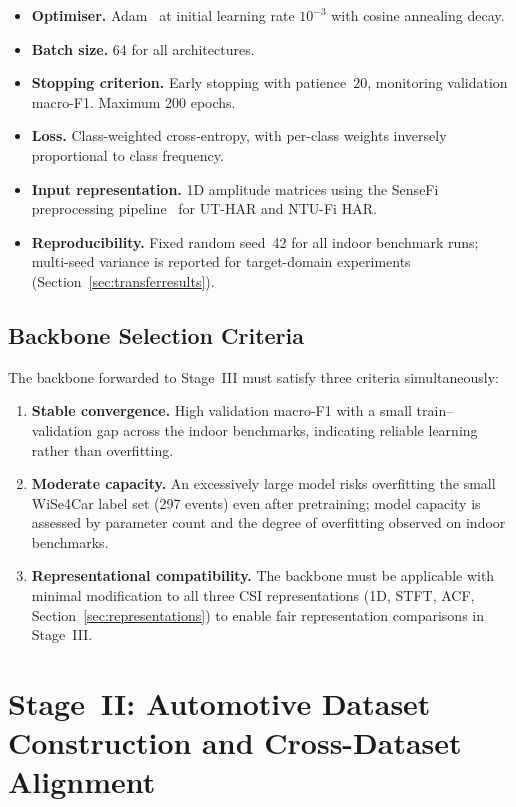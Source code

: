 \documentclass[english,bibtex]{kththesis}
\begin{document}
\begin{itemize}
  \item \textbf{Optimiser.} Adam~\cite{kingma2015adam} at initial learning rate $10^{-3}$ with cosine annealing decay.
  \item \textbf{Batch size.} 64 for all architectures.
  \item \textbf{Stopping criterion.} Early stopping with patience~20, monitoring validation macro-F1. Maximum 200 epochs.
  \item \textbf{Loss.} Class-weighted cross-entropy, with per-class weights inversely proportional to class frequency.
  \item \textbf{Input representation.} 1D amplitude matrices using the SenseFi preprocessing pipeline~\cite{yang2023sensefi} for UT-HAR and NTU-Fi HAR.
  \item \textbf{Reproducibility.} Fixed random seed~42 for all indoor benchmark runs; multi-seed variance is reported for target-domain experiments (Section~\ref{sec:transferresults}).
\end{itemize}

\subsection{Backbone Selection Criteria}
\label{sec:backbonesel}

The backbone forwarded to Stage~III must satisfy three criteria simultaneously:

\begin{enumerate}
  \item \textbf{Stable convergence.} High validation macro-F1 with a small train--validation gap across the indoor benchmarks, indicating reliable learning rather than overfitting.
  \item \textbf{Moderate capacity.} An excessively large model risks overfitting the small WiSe4Car label set (297 events) even after pretraining; model capacity is assessed by parameter count and the degree of overfitting observed on indoor benchmarks.
  \item \textbf{Representational compatibility.} The backbone must be applicable with minimal modification to all three CSI representations (1D, STFT, ACF, Section~\ref{sec:representations}) to enable fair representation comparisons in Stage~III.
\end{enumerate}

\section{Stage~II: Automotive Dataset Construction and Cross-Dataset Alignment}
\label{sec:stage2}
\end{document}
